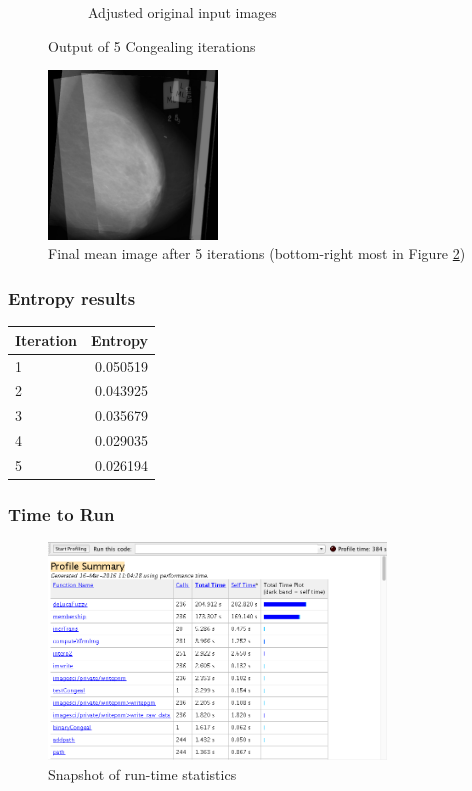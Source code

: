 \begin{figure}[!ht]
\begin{subfigure}[b]{0.4\textwidth}
        \caption{Adjusted original input images}
        \label{fig:adj-ser}
    \end{subfigure}
    \caption{Output of 5 \Gls{Congealing} iterations}\label{fig:mammo-results}
\end{figure}

\begin{figure}[!ht]
  \centering
  \includegraphics[width=0.4\textwidth]{Chapter2/non-prob-img/final_mean.jpg}
  \caption{Final mean image after 5 iterations (bottom-right most in Figure \ref{fig:mammo-results})}
  \label{fig:final-mean}
\end{figure}

\subsubsection{Entropy results}

  \begin{tabular}{ | l | r | }
    \hline
    \textbf{Iteration} & \textbf{Entropy} \\
    \hline
    1 & 0.050519 \\ \hline
    2 & 0.043925 \\ \hline
    3 & 0.035679 \\ \hline
    4 & 0.029035 \\ \hline
    5 & 0.026194 \\ \hline
  \end{tabular}

\subsubsection{Time to Run}

\begin{figure}[!ht]
  \centering
  \includegraphics[width=0.8\textwidth]{Chapter2/non-prob-img/Run-time.png}
  \caption{Snapshot of run-time statistics}
  \label{fig:run-time}
\end{figure}
